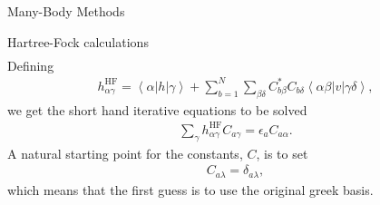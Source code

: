 \documentclass[twoside,english]{uiofysmaster}
\begin{document}
\begin{chapter}{Many-Body Methods}
\begin{section}{Hartree-Fock calculations}
\begin{align}
  		\end{align}
  		Defining
  		\begin{align}
  			h_{\alpha \gamma}^{\text{HF}} = \left< \alpha \right| h \left| \gamma \right> + \sum_{b=1}^N \sum_{\beta \delta} C_{b \beta}^* C_{b \delta} \left< \alpha \beta \right| v \left| \gamma \delta \right> ,
  		\end{align}
  		we get the short hand iterative equations to be solved 
  		\begin{align}
  			\sum_{\gamma} h_{\alpha \gamma}^{\text{HF}} C_{a \gamma} = \epsilon_{a} C_{a \alpha}.
  		\end{align}
  		A natural starting point for the constants, $C$, is to set
  		\begin{align}
  			C_{a\lambda} = \delta_{a \lambda},
  		\end{align}
  		which means that the first guess is to use the original greek basis. 
 	\end{section}

\end{chapter}
\end{document}
